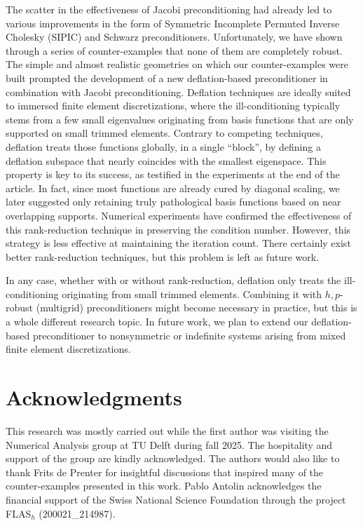 \documentclass{article}
\numberwithin{equation}{section}
\theoremstyle{definition}
\begin{document}
The scatter in the effectiveness of Jacobi preconditioning had already led to various improvements in the form of Symmetric Incomplete Permuted Inverse Cholesky (SIPIC) and Schwarz preconditioners. Unfortunately, we have shown through a series of counter-examples that none of them are completely robust. The simple and almost realistic geometries on which our counter-examples were built prompted the development of a new deflation-based preconditioner in combination with Jacobi preconditioning. Deflation techniques are ideally suited to immersed finite element discretizations, where the ill-conditioning typically stems from a few small eigenvalues originating from basis functions that are only supported on small trimmed elements. Contrary to competing techniques, deflation treats those functions globally, in a single ``block'', by defining a deflation subspace that nearly coincides with the smallest eigenspace. This property is key to its success, as testified in the experiments at the end of the article. In fact, since most functions are already cured by diagonal scaling, we later suggested only retaining truly pathological basis functions based on near overlapping supports. Numerical experiments have confirmed the effectiveness of this rank-reduction technique in preserving the condition number. However, this strategy is less effective at maintaining the iteration count. There certainly exist better rank-reduction techniques, but this problem is left as future work.

In any case, whether with or without rank-reduction, deflation only treats the ill-conditioning originating from small trimmed elements. Combining it with $h,p$-robust (multigrid) preconditioners might become necessary in practice, but this is a whole different research topic. In future work, we plan to extend our deflation-based preconditioner to nonsymmetric or indefinite systems arising from mixed finite element discretizations.

\section*{Acknowledgments}
This research was mostly carried out while the first author was visiting the Numerical Analysis group at TU Delft during fall 2025. The hospitality and support of the group are kindly acknowledged. The authors would also like to thank Frits de Prenter for insightful discussions that inspired many of the counter-examples presented in this work.
Pablo Antolin acknowledges the financial support of the Swiss National Science Foundation through
the project FLAS$_h$ (200021\_214987).
\end{document}
